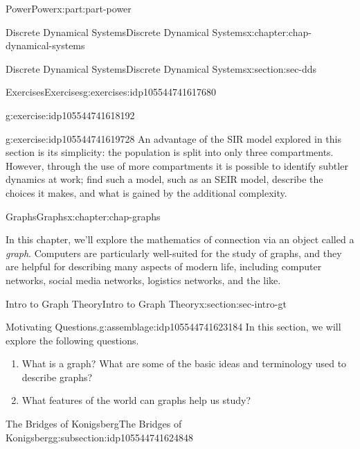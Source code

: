 \documentclass[oneside,10pt,]{book}
\numberwithin{equation}{section}
\begin{document}
\begin{partptx}{Power}{}{Power}{}{}{x:part:part-power}
\begin{chapterptx}{Discrete Dynamical Systems}{}{Discrete Dynamical Systems}{}{}{x:chapter:chap-dynamical-systems}
\begin{sectionptx}{Discrete Dynamical Systems}{}{Discrete Dynamical Systems}{}{}{x:section:sec-dds}
\begin{exercises-subsection}{Exercises}{}{Exercises}{}{}{g:exercises:idp105544741617680}
\begin{divisionexercise}{1}{}{}{g:exercise:idp105544741618192}
\end{divisionexercise}%
\begin{divisionexercise}{2}{}{}{g:exercise:idp105544741619728}%
An advantage of the SIR model explored in this section is its simplicity: the population is split into only three compartments. However, through the use of more compartments it is possible to identify subtler dynamics at work; find such a model, such as an SEIR model, describe the choices it makes, and what is gained by the additional complexity.%
\end{divisionexercise}%
\end{exercises-subsection}
\end{sectionptx}
\end{chapterptx}
%
\typeout{************************************************}
\typeout{************************************************}
%
\begin{chapterptx}{Graphs}{}{Graphs}{}{}{x:chapter:chap-graphs}
\begin{introduction}{}%
In this chapter, we'll explore the mathematics of connection via an object called a \emph{graph}. Computers are particularly well-suited for the study of graphs, and they are helpful for describing many aspects of modern life, including computer networks, social media networks, logistics networks, and the like.%
\end{introduction}%
%
%
\typeout{************************************************}
\typeout{************************************************}
%
\begin{sectionptx}{Intro to Graph Theory}{}{Intro to Graph Theory}{}{}{x:section:sec-intro-gt}
\begin{assemblage}{Motivating Questions.}{g:assemblage:idp105544741623184}%
In this section, we will explore the following questions. %
\begin{enumerate}
\item{}What is a graph? What are some of the basic ideas and terminology used to describe graphs?%
\item{}What features of the world can graphs help us study?%
\end{enumerate}
%
\end{assemblage}
%
%
\typeout{************************************************}
\typeout{************************************************}
%
\begin{subsectionptx}{The Bridges of Konigsberg}{}{The Bridges of Konigsberg}{}{}{g:subsection:idp105544741624848}

\end{subsectionptx}
\end{sectionptx}
\end{chapterptx}
\end{partptx}
\end{document}
